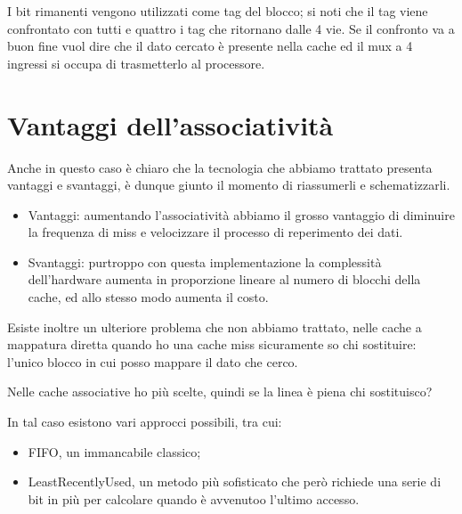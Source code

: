 \documentclass[class=book, crop=false, oneside]{standalone}
\begin{document}
I bit rimanenti vengono utilizzati come tag del blocco; si noti che il tag viene confrontato con tutti e quattro i tag che ritornano dalle 4 vie.
Se il confronto va a buon fine vuol dire che il dato cercato è presente nella cache ed il mux a 4 ingressi si occupa di trasmetterlo al processore.

\section{Vantaggi dell'associatività}
Anche in questo caso è chiaro che la tecnologia che abbiamo trattato presenta vantaggi e svantaggi, è dunque giunto il momento di riassumerli e schematizzarli.
\begin{itemize}
	\item Vantaggi: aumentando l’associatività abbiamo il grosso vantaggio di diminuire la frequenza di miss e velocizzare il processo di reperimento dei dati.
	\item Svantaggi: purtroppo con questa implementazione la complessità dell'hardware aumenta in proporzione lineare al numero di blocchi della cache, ed allo stesso modo aumenta il costo.
\end{itemize}

Esiste inoltre un ulteriore problema che non abbiamo trattato, nelle cache a mappatura diretta quando ho una cache miss sicuramente so chi sostituire: l’unico blocco in cui posso mappare il dato che cerco.

Nelle cache associative ho più scelte, quindi se la linea è piena chi sostituisco?

In tal caso esistono vari approcci possibili, tra cui:
\begin{itemize}
	\item FIFO, un immancabile classico;
	\item LeastRecentlyUsed, un metodo più sofisticato che però richiede una serie di bit in più per calcolare quando è avvenutoo l'ultimo accesso.
\end{itemize}
\end{document}
